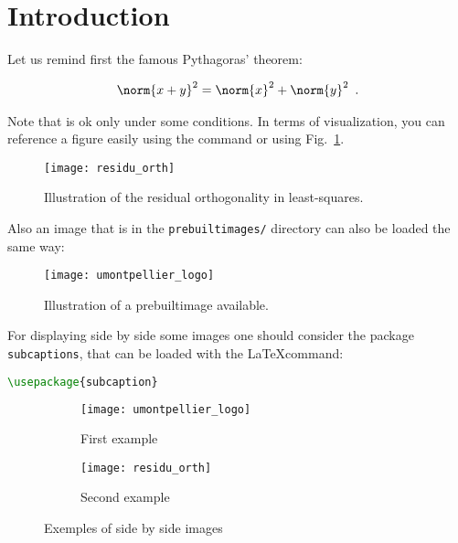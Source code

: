 

\section{Introduction}
\label{sec:introduction}

Let us remind first the famous Pythagoras' theorem:

\begin{align}\label{eq:pythagore}   
	\norm{x+y}^2 = \norm{x}^2 + \norm{y}^2 \enspace.
\end{align}

Note that  is ok only under some conditions.
In terms of visualization, you can reference a figure easily using the command  or using Fig.~\ref{fig:pythagore}.

\begin{figure}[h] %
	\centering
	\texttt{[image: residu\_orth]}
	\caption{Illustration of the residual orthogonality in least-squares.}
	\label{fig:pythagore}
\end{figure}


Also an image that is in the \texttt{prebuiltimages/} directory can also be loaded the same way:

\begin{figure}[h] %
	\centering
	\texttt{[image: umontpellier\_logo]}
	\caption{Illustration of a prebuiltimage available.}
	\label{fig:umontpellier_logo}
\end{figure}


For displaying side by side some images one should consider the package \lstinline+subcaptions+, that can be loaded with the \LaTeX command:

\begin{lstlisting}[language=tex]
\usepackage{subcaption}
\end{lstlisting}


\begin{figure}[t] %
    \centering
    \begin{subfigure}[b]{0.33\textwidth}
    	\centering
        \texttt{[image: umontpellier\_logo]}%
        \caption{First example}
        \label{subfig:pythagore}
    \end{subfigure}
    \begin{subfigure}[b]{0.56\textwidth}
    	\centering
        \texttt{[image: residu\_orth]}%
        \caption{Second example}
        \label{subfig:logo}
    \end{subfigure}
    \caption{Exemples of side by side images}
    \label{fig:double_example}
\end{figure}

